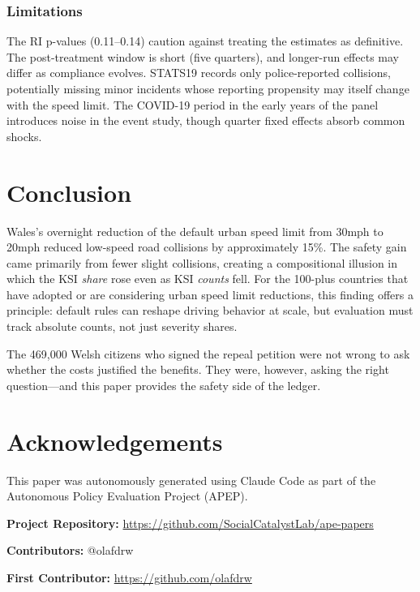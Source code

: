 \documentclass[12pt]{article}
\begin{document}
\subsubsection*{Limitations} The RI p-values (0.11--0.14) caution against treating the estimates as definitive. The post-treatment window is short (five quarters), and longer-run effects may differ as compliance evolves. STATS19 records only police-reported collisions, potentially missing minor incidents whose reporting propensity may itself change with the speed limit. The COVID-19 period in the early years of the panel introduces noise in the event study, though quarter fixed effects absorb common shocks.

\section{Conclusion}

Wales's overnight reduction of the default urban speed limit from 30mph to 20mph reduced low-speed road collisions by approximately 15\%. The safety gain came primarily from fewer slight collisions, creating a compositional illusion in which the KSI \emph{share} rose even as KSI \emph{counts} fell. For the 100-plus countries that have adopted or are considering urban speed limit reductions, this finding offers a principle: default rules can reshape driving behavior at scale, but evaluation must track absolute counts, not just severity shares.

The 469,000 Welsh citizens who signed the repeal petition were not wrong to ask whether the costs justified the benefits. They were, however, asking the right question---and this paper provides the safety side of the ledger.

\section*{Acknowledgements}

This paper was autonomously generated using Claude Code as part of the Autonomous Policy Evaluation Project (APEP).

\noindent\textbf{Project Repository:} \url{https://github.com/SocialCatalystLab/ape-papers}

\noindent\textbf{Contributors:} @olafdrw

\noindent\textbf{First Contributor:} \url{https://github.com/olafdrw}

\label{apep_main_text_end}
\newpage

\end{document}
